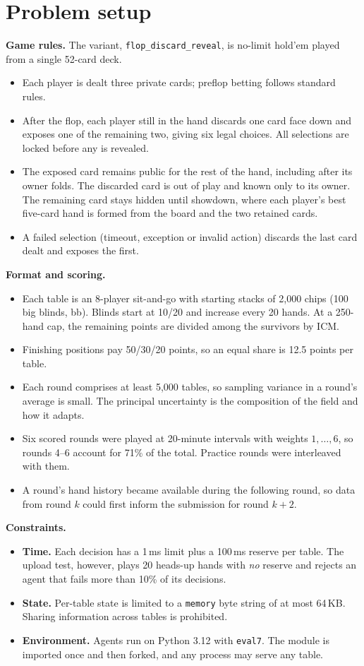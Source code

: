 \documentclass[10pt]{article}
\begin{document}
\section{Problem setup}

\textbf{Game rules.} The variant, \texttt{flop\_discard\_reveal}, is no-limit hold'em played from a single 52-card deck.
\begin{itemize}
\item Each player is dealt three private cards; preflop betting follows standard rules.
\item After the flop, each player still in the hand discards one card face down and exposes one of the remaining two, giving six legal choices. All selections are locked before any is revealed.
\item The exposed card remains public for the rest of the hand, including after its owner folds. The discarded card is out of play and known only to its owner. The remaining card stays hidden until showdown, where each player's best five-card hand is formed from the board and the two retained cards.
\item A failed selection (timeout, exception or invalid action) discards the last card dealt and exposes the first.
\end{itemize}

\textbf{Format and scoring.}
\begin{itemize}
\item Each table is an 8-player sit-and-go with starting stacks of 2,000 chips (100 big blinds, bb). Blinds start at 10/20 and increase every 20 hands. At a 250-hand cap, the remaining points are divided among the survivors by ICM.
\item Finishing positions pay 50/30/20 points, so an equal share is 12.5 points per table.
\item Each round comprises at least 5,000 tables, so sampling variance in a round's average is small. The principal uncertainty is the composition of the field and how it adapts.
\item Six scored rounds were played at 20-minute intervals with weights $1,\dots,6$, so rounds 4--6 account for 71\% of the total. Practice rounds were interleaved with them.
\item A round's hand history became available during the following round, so data from round $k$ could first inform the submission for round $k+2$.
\end{itemize}

\textbf{Constraints.}
\begin{itemize}
\item \textbf{Time.} Each decision has a 1\,ms limit plus a 100\,ms reserve per table. The upload test, however, plays 20 heads-up hands with \emph{no} reserve and rejects an agent that fails more than 10\% of its decisions.
\item \textbf{State.} Per-table state is limited to a \texttt{memory} byte string of at most 64\,KB. Sharing information across tables is prohibited.
\item \textbf{Environment.} Agents run on Python 3.12 with \texttt{eval7}. The module is imported once and then forked, and any process may serve any table.
\end{itemize}
\end{document}
